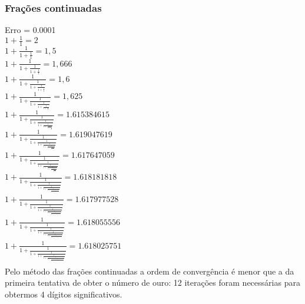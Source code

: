 \documentclass[11pt]{article}
\begin{document}
\subsubsection{Frações continuadas}\label{sec:fraccont}
Erro = 0.0001 \\
$1 + \frac{1}{1} = 2$ \\
$1 + \frac{1}{1 + \frac{1}{1}} = 1,5$ \\
$1 + \frac{1}{1 + \frac{1}{1 + \frac{1}{1}}} = 1,666$ \\
$1 + \frac{1}{1 + \frac{1}{1 + \frac{1}{1 + \frac{1}{1}}}} = 1,6$ \\
$1 + \frac{1}{1 + \frac{1}{1 + \frac{1}{1 + \frac{1}{1 + \frac{1}{1}}}}} = 1,625$ \\
$1 + \frac{1}{1 + \frac{1}{1 + \frac{1}{1 + \frac{1}{1 + \frac{1}{1 + \frac{1}{1}}}}}} = 1.615384615$ \\
$1 + \frac{1}{1 + \frac{1}{1 + \frac{1}{1 + \frac{1}{1 + \frac{1}{1 + \frac{1}{1 + \frac{1}{1}}}}}}} = 1.619047619$ \\
$1 + \frac{1}{1 + \frac{1}{1 + \frac{1}{1 + \frac{1}{1 + \frac{1}{1 + \frac{1}{1 + \frac{1}{1 + \frac{1}{1}}}}}}}} = 1.617647059$ \\
$1 + \frac{1}{1 + \frac{1}{1 + \frac{1}{1 + \frac{1}{1 + \frac{1}{1 + \frac{1}{1 + \frac{1}{1 + \frac{1}{1 + \frac{1}{1}}}}}}}}} = 1.618181818$ \\
$1 + \frac{1}{1 + \frac{1}{1 + \frac{1}{1 + \frac{1}{1 + \frac{1}{1 + \frac{1}{1 + \frac{1}{1 + \frac{1}{1 + \frac{1}{1 + \frac{1}{1}}}}}}}}}} = 1.617977528$ \\
$1 + \frac{1}{1 + \frac{1}{1 + \frac{1}{1 + \frac{1}{1 + \frac{1}{1 + \frac{1}{1 + \frac{1}{1 + \frac{1}{1 + \frac{1}{1 + \frac{1}{1 + \frac{1}{1}}}}}}}}}}} = 1.618055556$ \\
$1 + \frac{1}{1 + \frac{1}{1 + \frac{1}{1 + \frac{1}{1 + \frac{1}{1 + \frac{1}{1 + \frac{1}{1 + \frac{1}{1 + \frac{1}{1 + \frac{1}{1 + \frac{1}{1 + \frac{1}{1}}}}}}}}}}}} = 1.618025751$ \\

Pelo método das frações continuadas a ordem de convergência é menor que a da primeira tentativa de obter o número de ouro: 12 iterações
foram necessárias para obtermos 4 dígitos significativos. \\
\end{document}
